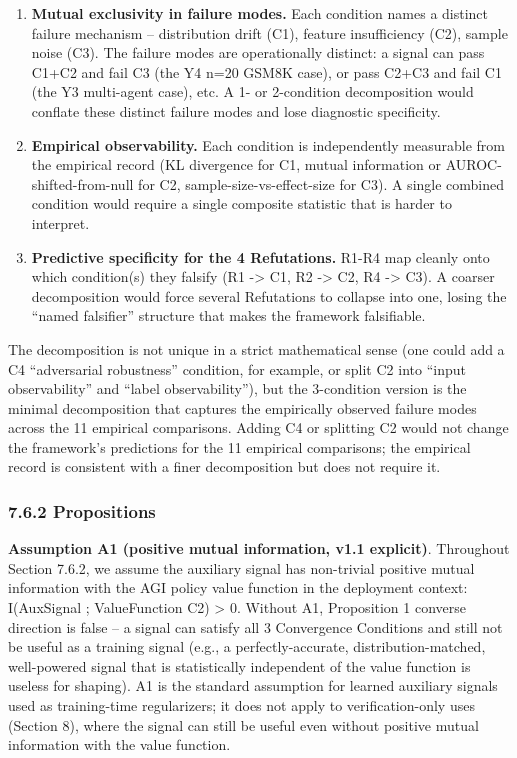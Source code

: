 \documentclass[11pt]{article}
\begin{document}
\begin{enumerate}
\def\labelenumi{\arabic{enumi}.}
\item
  \textbf{Mutual exclusivity in failure modes.} Each condition names a
  distinct failure mechanism -- distribution drift (C1), feature
  insufficiency (C2), sample noise (C3). The failure modes are
  operationally distinct: a signal can pass C1+C2 and fail C3 (the Y4
  n=20 GSM8K case), or pass C2+C3 and fail C1 (the Y3 multi-agent case),
  etc. A 1- or 2-condition decomposition would conflate these distinct
  failure modes and lose diagnostic specificity.
\item
  \textbf{Empirical observability.} Each condition is independently
  measurable from the empirical record (KL divergence for C1, mutual
  information or AUROC-shifted-from-null for C2,
  sample-size-vs-effect-size for C3). A single combined condition would
  require a single composite statistic that is harder to interpret.
\item
  \textbf{Predictive specificity for the 4 Refutations.} R1-R4 map
  cleanly onto which condition(s) they falsify (R1 -\textgreater{} C1,
  R2 -\textgreater{} C2, R4 -\textgreater{} C3). A coarser decomposition
  would force several Refutations to collapse into one, losing the
  ``named falsifier'' structure that makes the framework falsifiable.
\end{enumerate}

The decomposition is not unique in a strict mathematical sense (one
could add a C4 ``adversarial robustness'' condition, for example, or
split C2 into ``input observability'' and ``label observability''), but
the 3-condition version is the minimal decomposition that captures the
empirically observed failure modes across the 11 empirical comparisons.
Adding C4 or splitting C2 would not change the framework's predictions
for the 11 empirical comparisons; the empirical record is consistent
with a finer decomposition but does not require it.

\subsubsection{7.6.2 Propositions}\label{propositions}

\textbf{Assumption A1 (positive mutual information, v1.1 explicit)}.
Throughout Section 7.6.2, we assume the auxiliary signal has non-trivial
positive mutual information with the AGI policy value function in the
deployment context: I(AuxSignal ; ValueFunction \textbar{} C2)
\textgreater{} 0. Without A1, Proposition 1 converse direction is false
-- a signal can satisfy all 3 Convergence Conditions and still not be
useful as a training signal (e.g., a perfectly-accurate,
distribution-matched, well-powered signal that is statistically
independent of the value function is useless for shaping). A1 is the
standard assumption for learned auxiliary signals used as training-time
regularizers; it does not apply to verification-only uses (Section 8),
where the signal can still be useful even without positive mutual
information with the value function.
\end{document}
